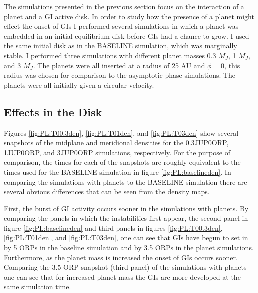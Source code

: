 The simulations presented in the previous section focus on the interaction of a planet and a GI active disk. In order to study how the presence of a planet might effect the onset of GIs I performed several simulations in which a planet was embedded in an initial equilibrium disk before GIs had a chance to grow. I used the same initial disk as in the BASELINE simulation, which was marginally stable. I performed three simulations with different planet masses 0.3 $M_J$, 1 $M_J$, and 3 $M_J$. The planets were all inserted at a radius of 25 AU and $\phi = 0$, this radius was chosen for comparison to the asymptotic phase simulations. The planets were all initially given a circular velocity.

\subsection{Effects in the Disk}

Figures \ref{fig:PL:T00.3den}, \ref{fig:PL:T01den}, and \ref{fig:PL:T03den} show several snapshots of the midplane and meridional densities for the 0.3JUP0ORP, 1JUP0ORP, and 3JUP0ORP simulations, respectively. For the purpose of comparison, the times for each of the snapshots are roughly equivalent to the times used for the BASELINE simulation in figure \ref{fig:PL:baselineden}. In comparing the simulations with planets to the BASELINE simulation there are several obvious differences that can be seen from the density maps.

First, the burst of GI activity occurs sooner in the simulations with planets. By comparing the panels in which the instabilities first appear, the second panel in figure \ref{fig:PL:baselineden} and third panels in figures \ref{fig:PL:T00.3den}, \ref{fig:PL:T01den}, and \ref{fig:PL:T03den}, one can see that GIs have begun to set in by 5 ORPs in the baseline simulation and by 3.5 ORPs in the planet simulations. Furthermore, as the planet mass is increased the onset of GIs occurs sooner. Comparing the 3.5 ORP snapshot (third panel) of the simulations with planets one can see that for increased planet mass the GIs are more developed at the same simulation time.

